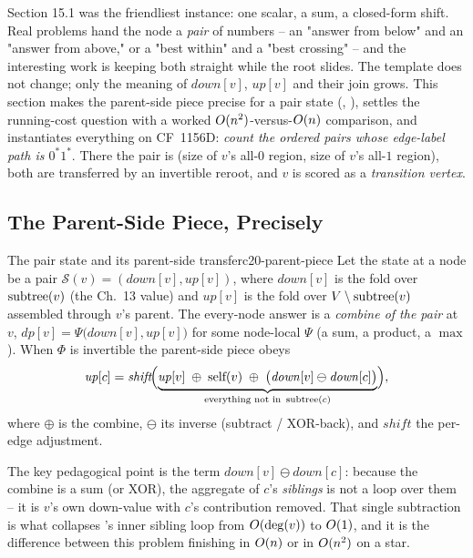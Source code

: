 \begin{topicintro}
Section 15.1 was the friendliest instance: one scalar, a sum, a closed-form
shift. Real problems hand the node a \emph{pair} of numbers -- an "answer from
below" and an "answer from above," or a "best within" and a "best crossing" --
and the interesting work is keeping both straight while the root slides. The
template does not change; only the meaning of $\mathit{down}[v]$,
$\mathit{up}[v]$ and their join grows. This section makes the parent-side piece
precise for a pair state (,
), settles the running-cost question with a
worked $O(n^2)$-versus-$O(n)$ comparison, and instantiates everything
on CF~1156D: \emph{count the ordered pairs whose edge-label path is
$0^{\ast}1^{\ast}$}. There the pair is (size of $v$'s all-$0$ region, size of
$v$'s all-$1$ region), both are transferred by an invertible reroot, and $v$ is
scored as a \emph{transition vertex}.
\end{topicintro}

\subsection{The Parent-Side Piece, Precisely}

\begin{definition}{The pair state and its parent-side transfer}{c20-parent-piece}
Let the state at a node be a pair $\mathcal S(v) = (\mathit{down}[v],
\mathit{up}[v])$, where $\mathit{down}[v]$ is the fold over $\operatorname{subtree}(v)$ (the
Ch.~13  value) and $\mathit{up}[v]$ is the fold
over $V \setminus \operatorname{subtree}(v)$ assembled through $v$'s parent. The every-node
answer is a \emph{combine of the pair} at $v$,
$\mathit{dp}[v] = \Psi\bigl(\mathit{down}[v], \mathit{up}[v]\bigr)$ for some
node-local $\Psi$ (a sum, a product, a $\max$). When $\Phi$ is invertible the
parent-side piece obeys
\[
  \mathit{up}[c] = \mathit{shift}\!\Bigl(
      \underbrace{\mathit{up}[v] \;\oplus\; \text{self}(v)
      \;\oplus\; \bigl(\mathit{down}[v] \ominus \mathit{down}[c]\bigr)}_{\text{everything not in }\operatorname{subtree}(c)}
  \Bigr),
\]
where $\oplus$ is the combine, $\ominus$ its inverse (subtract / XOR-back), and
$\mathit{shift}$ the per-edge adjustment.
\end{definition}

The key pedagogical point is the term
$\mathit{down}[v] \ominus \mathit{down}[c]$: because the combine is a sum (or
XOR), the aggregate of $c$'s \emph{siblings} is not a loop over them -- it is
$v$'s own down-value with $c$'s contribution removed. That single subtraction
is what collapses 's inner sibling loop from
$O(\deg(v))$ to $O(1)$, and it is the difference between this problem
finishing in $O(n)$ or in $O(n^2)$ on a star.

